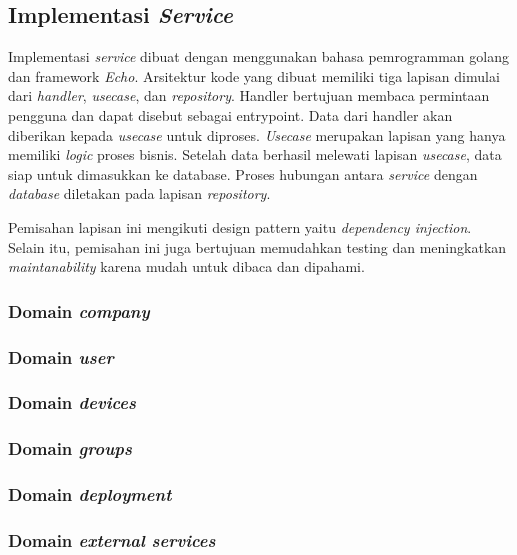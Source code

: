 \subsection{Implementasi \textit{Service}}

Implementasi \textit{service} dibuat dengan menggunakan bahasa pemrogramman golang dan framework \textit{Echo}. Arsitektur kode yang dibuat memiliki tiga lapisan dimulai dari \textit{handler}, \textit{usecase}, dan \textit{repository}. Handler bertujuan membaca permintaan pengguna dan dapat disebut sebagai entrypoint. Data dari handler akan diberikan kepada \textit{usecase} untuk diproses. \textit{Usecase} merupakan lapisan yang hanya memiliki \textit{logic} proses bisnis. Setelah data berhasil melewati lapisan \textit{usecase}, data siap untuk dimasukkan ke database. Proses hubungan antara \textit{service} dengan \textit{database} diletakan pada lapisan \textit{repository}. 

Pemisahan lapisan ini mengikuti design pattern yaitu \textit{dependency injection}. Selain itu, pemisahan ini juga bertujuan memudahkan testing dan meningkatkan \textit{maintanability} karena mudah untuk dibaca dan dipahami.

\subsubsection{Domain \textit{company}}
\subsubsection{Domain \textit{user}}
\subsubsection{Domain \textit{devices}}
\subsubsection{Domain \textit{groups}}
\subsubsection{Domain \textit{deployment}}
\subsubsection{Domain \textit{external services}}